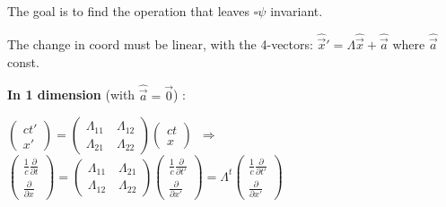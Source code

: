 \begin{squishlist}
\item[] The goal is to find the operation that leaves $\square \psi$ invariant.

\item The change in coord must be linear, with the 4-vectors: $\hat{\vec{x}}' = \Lambda\hat{\vec{x}} + \hat{\vec{a}}$ where $ \hat{\vec{a}}$ const.

\item[] \textbf{In 1 dimension} (with $\hat{\vec{a}} = \vec{0}$) : 
\item $\begin{pmatrix}
					ct'\\
					x'
					\end{pmatrix} =
					\begin{pmatrix}
					\Lambda_{11} \quad \Lambda_{12}\\
					\Lambda_{21} \quad \Lambda_{22}
					\end{pmatrix}
					\begin{pmatrix}
					ct\\
					x
					\end{pmatrix}\, $
			        $\Rightarrow$ 	$\begin{pmatrix}
					\frac{1}{c}\frac{\partial}{\partial t}\\
					\frac{\partial}{\partial x} 
					\end{pmatrix} =
					\begin{pmatrix}
					\Lambda_{11} \quad \Lambda_{21}\\
					\Lambda_{12} \quad \Lambda_{22}
					\end{pmatrix}					
					\begin{pmatrix}
					\frac{1}{c}\frac{\partial}{\partial t'}\\
					\frac{\partial}{\partial x'} 
					\end{pmatrix} =	\Lambda^{t}
					\begin{pmatrix}
					\frac{1}{c}\frac{\partial}{\partial t'}\\
					\frac{\partial}{\partial x'} 
					\end{pmatrix}$\\
					

\end{squishlist}
